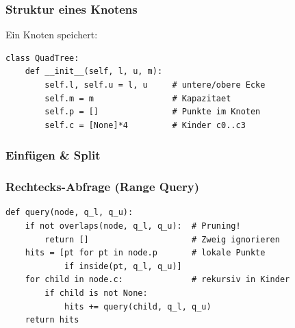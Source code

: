 \subsubsection{Struktur eines Knotens}
\begin{contentbox}
Ein Knoten speichert:
\begin{factlist}
\end{factlist}
\end{contentbox}
\begin{codebox}
\begin{lstlisting}[style=CodeExpert]
class QuadTree:
    def __init__(self, l, u, m):
        self.l, self.u = l, u     # untere/obere Ecke
        self.m = m                # Kapazitaet
        self.p = []               # Punkte im Knoten
        self.c = [None]*4         # Kinder c0..c3
\end{lstlisting}
\end{codebox}

\subsubsection{Einfügen \& Split}
\begin{procedure}[Ablauf]
\end{procedure}

\subsubsection{Rechtecks-Abfrage (Range Query)}
\begin{contentbox}
\begin{factlist}
\end{factlist}
\end{contentbox}
\begin{codebox}
\begin{lstlisting}[style=CodeExpert]
def query(node, q_l, q_u):
    if not overlaps(node, q_l, q_u):  # Pruning!
        return []                     # Zweig ignorieren
    hits = [pt for pt in node.p       # lokale Punkte
            if inside(pt, q_l, q_u)]
    for child in node.c:              # rekursiv in Kinder
        if child is not None:
            hits += query(child, q_l, q_u)
    return hits
\end{lstlisting}
\end{codebox}

